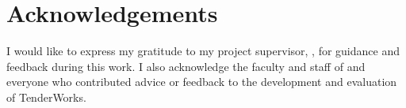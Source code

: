 \section*{Acknowledgements}
I would like to express my gratitude to my project supervisor, \supname, for guidance and feedback during this work. I also acknowledge the faculty and staff of \univname{} and everyone who contributed advice or feedback to the development and evaluation of TenderWorks.

\vspace{1cm}
\begin{flushright}
\authorname
\end{flushright}
\clearpage
